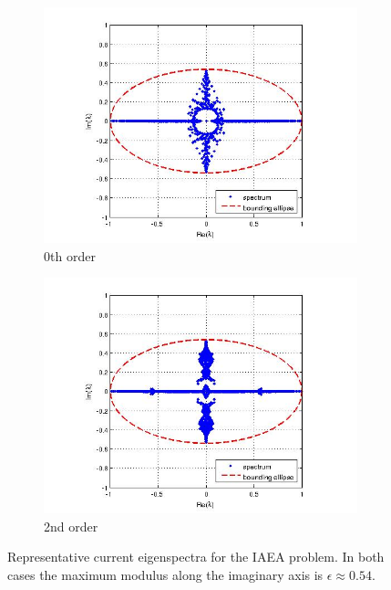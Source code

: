 \begin{figure}[ht]
  \centering
  \begin{subfigure}[b]{0.49\textwidth}
    \centering
    \includegraphics[width=\textwidth]
                    {spectrum0.jpg}
    \caption{0th order}
  \end{subfigure}
    \begin{subfigure}[b]{0.49\textwidth}
      \centering
      \includegraphics[width=\textwidth]
                      {spectrum2.jpg}
      \caption{2nd order}
    \end{subfigure}
    \caption{Representative current eigenspectra for the IAEA problem.  In both 
             cases the maximum modulus along the imaginary axis is 
             $\epsilon \approx 0.54$.}            
  \label{fig:spectrum}            
\end{figure}


